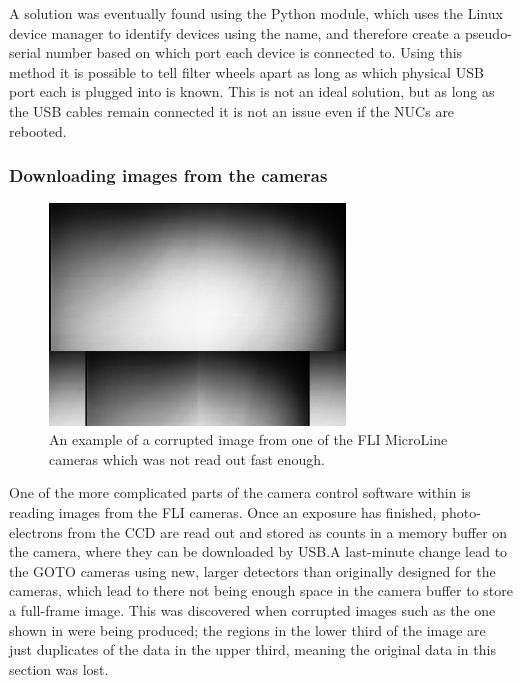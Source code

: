 \begin{colsection}
\begin{colsection}
A solution was eventually found using the Python  module, which uses the Linux  device manager to identify devices using the  name, and therefore create a pseudo-serial number based on which port each device is connected to. Using this method it is possible to tell filter wheels apart as long as which physical USB port each is plugged into is known. This is not an ideal solution, but as long as the USB cables remain connected it is not an issue even if the NUCs are rebooted.

\subsubsection{Downloading images from the cameras}

\begin{figure}[t]
    \begin{center}
        \includegraphics[width=0.7\textwidth]{images/cam_readout.png}
    \end{center}
    \caption[A corrupted image which was not read out fast enough]{
        An example of a corrupted image from one of the FLI MicroLine cameras which was not read out fast enough.
    }\label{fig:cam_readout}
\end{figure}

One of the more complicated parts of the camera control software within  is reading images from the FLI cameras. Once an exposure has finished, photo-electrons from the CCD are read out and stored as counts in a memory buffer on the camera, where they can be downloaded by USB.\@ A last-minute change lead to the GOTO cameras using new, larger detectors than originally designed for the cameras, which lead to there not being enough space in the camera buffer to store a full-frame image. This was discovered when corrupted images such as the one shown in  were being produced; the regions in the lower third of the image are just duplicates of the data in the upper third, meaning the original data in this section was lost.


\end{colsection}
\end{colsection}
